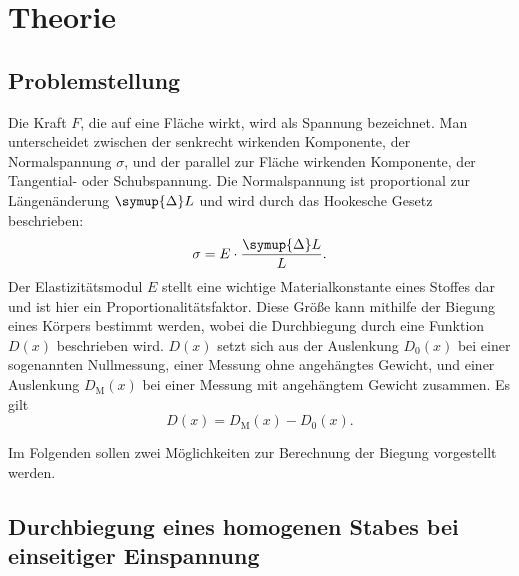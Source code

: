\section{Theorie} \label{sec:theorie}

\subsection{Problemstellung} \label{sec:problem}

    Die Kraft $F$, die auf eine Fläche wirkt, wird als Spannung bezeichnet.
    Man unterscheidet zwischen der senkrecht wirkenden Komponente, der Normalspannung $\sigma$,
    und der parallel zur Fläche wirkenden Komponente, der Tangential- oder Schubspannung.
    Die Normalspannung ist proportional zur Längenänderung $\symup{\Delta}L$ und wird
    durch das Hookesche Gesetz beschrieben:
    \begin{equation}
        \sigma = E \cdot \frac{\symup{\Delta}L}{L} .
    \end{equation}
    Der Elastizitätsmodul $E$ stellt eine wichtige Materialkonstante eines Stoffes dar und
    ist hier ein Proportionalitätsfaktor.
    Diese Größe kann mithilfe der Biegung eines Körpers bestimmt werden,
    wobei die Durchbiegung durch eine Funktion $D(x)$ beschrieben wird.
    $D(x)$ setzt sich aus der Auslenkung $D_0(x)$ bei einer sogenannten Nullmessung,
    einer Messung ohne angehängtes Gewicht, und einer Auslenkung $D_\text{M}(x)$  bei einer
    Messung mit angehängtem Gewicht zusammen.
    Es gilt
    \begin{equation} \label{eqn:realeDurchbiegung}
        D(x) = D_\text{M}(x) - D_0(x) .
    \end{equation}

    Im Folgenden sollen zwei Möglichkeiten zur Berechnung der Biegung vorgestellt werden.

\subsection{Durchbiegung eines homogenen Stabes bei einseitiger Einspannung} \label{sec:einseitig}

